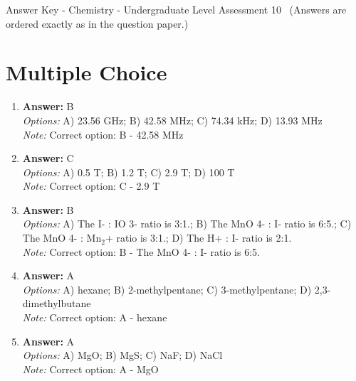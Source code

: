 \documentclass[12pt]{article}
\begin{document}
\begin{center}
Answer Key - Chemistry - Undergraduate Level Assessment 10 \
\small (Answers are ordered exactly as in the question paper.)
\end{center}

\section*{Multiple Choice}
\begin{enumerate}[label=\arabic*.]
\item \textbf{Answer:} B
\\ \textit{Options:} A) 23.56 GHz; B) 42.58 MHz; C) 74.34 kHz; D) 13.93 MHz
\\ \textit{Note:} Correct option: B - 42.58 MHz
\item \textbf{Answer:} C
\\ \textit{Options:} A) 0.5 T; B) 1.2 T; C) 2.9 T; D) 100 T
\\ \textit{Note:} Correct option: C - 2.9 T
\item \textbf{Answer:} B
\\ \textit{Options:} A) The I- : IO 3- ratio is 3:1.; B) The MnO 4- : I- ratio is 6:5.; C) The MnO 4- : Mn$_{2}$+ ratio is 3:1.; D) The H+ : I- ratio is 2:1.
\\ \textit{Note:} Correct option: B - The MnO 4- : I- ratio is 6:5.
\item \textbf{Answer:} A
\\ \textit{Options:} A) hexane; B) 2-methylpentane; C) 3-methylpentane; D) 2,3-dimethylbutane
\\ \textit{Note:} Correct option: A - hexane
\item \textbf{Answer:} A
\\ \textit{Options:} A) MgO; B) MgS; C) NaF; D) NaCl
\\ \textit{Note:} Correct option: A - MgO
\end{enumerate}
\end{document}
